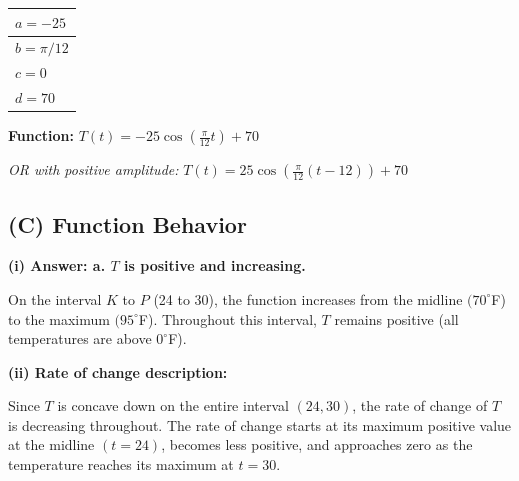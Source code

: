\documentclass[11pt]{article}
\begin{document}
\begin{center}
\begin{tabular}{|l|}
\hline
$a = -25$ \\[10pt]
\hline
$b = \pi/12$ \\[10pt]
\hline
$c = 0$ \\[10pt]
\hline
$d = 70$ \\[10pt]
\hline
\end{tabular}
\end{center}

\textbf{Function:} $\displaystyle T(t) = -25 \cos\left(\frac{\pi}{12} t\right) + 70$

\textit{OR with positive amplitude:} $\displaystyle T(t) = 25 \cos\left(\frac{\pi}{12}(t - 12)\right) + 70$

\subsection*{(C) Function Behavior}

\textbf{(i) Answer: a. $T$ is positive and increasing.}

On the interval $K$ to $P$ (24 to 30), the function increases from the midline $(70^\circ$F) to the maximum $(95^\circ$F). Throughout this interval, $T$ remains positive (all temperatures are above $0^\circ$F).

\vspace{0.5cm}
\textbf{(ii) Rate of change description:}

Since $T$ is concave down on the entire interval $(24, 30)$, the rate of change of $T$ is decreasing throughout. The rate of change starts at its maximum positive value at the midline $(t = 24)$, becomes less positive, and approaches zero as the temperature reaches its maximum at $t = 30$.
\end{document}
